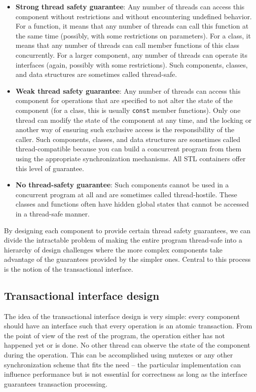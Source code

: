 \begin{itemize}
\item
  \textbf{Strong thread safety guarantee}: Any number of threads can access this component without restrictions and without encountering undefined behavior. For a function, it means that any number of threads can call this function at the same time (possibly, with some restrictions on parameters). For a class, it means that any number of threads can call member functions of this class concurrently. For a larger component, any number of threads can operate its interfaces (again, possibly with some restrictions). Such components, classes, and data structures are sometimes called thread-safe.
\item
  \textbf{Weak thread safety guarantee}: Any number of threads can access this component for operations that are specified to not alter the state of the component (for a class, this is usually \texttt{const} member functions). Only one thread can modify the state of the component at any time, and the locking or another way of ensuring such exclusive access is the responsibility of the caller. Such components, classes, and data structures are sometimes called thread-compatible because you can build a concurrent program from them using the appropriate synchronization mechanisms. All STL containers offer this level of guarantee.
\item
  \textbf{No thread-safety guarantee}: Such components cannot be used in a concurrent program at all and are sometimes called thread-hostile. These classes and functions often have hidden global states that cannot be accessed in a thread-safe manner.
\end{itemize}

By designing each component to provide certain thread safety guarantees, we can divide the intractable problem of making the entire program thread-safe into a hierarchy of design challenges where the more complex components take advantage of the guarantees provided by the simpler ones. Central to this process is the notion of the transactional interface.

\subsection{Transactional interface design}

The idea of the transactional interface design is very simple: every component should have an interface such that every operation is an atomic transaction. From the point of view of the rest of the program, the operation either has not happened yet or is done. No other thread can observe the state of the component during the operation. This can be accomplished using mutexes or any other synchronization scheme that fits the need -- the particular implementation can influence performance but is not essential for correctness as long as the interface guarantees transaction processing.

